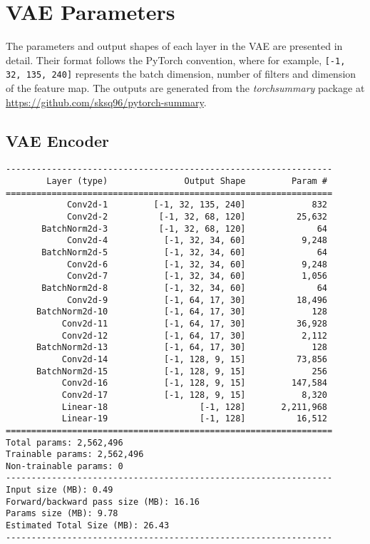 \chapter{VAE Parameters}
\label{app:vae_params}
The parameters and output shapes of each layer in the VAE are presented in detail. Their format follows the PyTorch convention, where for example, \verb+[-1, 32, 135, 240]+ represents the batch dimension, number of filters and dimension of the feature map. The outputs are generated from the \textit{torchsummary} package at \url{https://github.com/sksq96/pytorch-summary}.

\section{VAE Encoder}
\label{app:vae_encoder}
\begin{verbatim}
----------------------------------------------------------------
        Layer (type)               Output Shape         Param #
================================================================
            Conv2d-1         [-1, 32, 135, 240]             832
            Conv2d-2          [-1, 32, 68, 120]          25,632
       BatchNorm2d-3          [-1, 32, 68, 120]              64
            Conv2d-4           [-1, 32, 34, 60]           9,248
       BatchNorm2d-5           [-1, 32, 34, 60]              64
            Conv2d-6           [-1, 32, 34, 60]           9,248
            Conv2d-7           [-1, 32, 34, 60]           1,056
       BatchNorm2d-8           [-1, 32, 34, 60]              64
            Conv2d-9           [-1, 64, 17, 30]          18,496
      BatchNorm2d-10           [-1, 64, 17, 30]             128
           Conv2d-11           [-1, 64, 17, 30]          36,928
           Conv2d-12           [-1, 64, 17, 30]           2,112
      BatchNorm2d-13           [-1, 64, 17, 30]             128
           Conv2d-14           [-1, 128, 9, 15]          73,856
      BatchNorm2d-15           [-1, 128, 9, 15]             256
           Conv2d-16           [-1, 128, 9, 15]         147,584
           Conv2d-17           [-1, 128, 9, 15]           8,320
           Linear-18                  [-1, 128]       2,211,968
           Linear-19                  [-1, 128]          16,512
================================================================
Total params: 2,562,496
Trainable params: 2,562,496
Non-trainable params: 0
----------------------------------------------------------------
Input size (MB): 0.49
Forward/backward pass size (MB): 16.16
Params size (MB): 9.78
Estimated Total Size (MB): 26.43
----------------------------------------------------------------
\end{verbatim}

